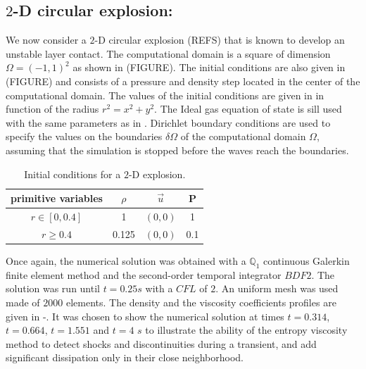\subsection{$2$-D circular explosion:} \label{sec:2d-circular-explosioin}
We now consider a $2$-D circular explosion (REFS) that is known to develop an unstable layer contact. The computational domain is a square of dimension $\Omega = (-1, 1)^2$ as shown in (FIGURE). The initial conditions are also given in (FIGURE) and consists of a pressure and density step located in the center of the computational domain. The values of the initial conditions are given in  in function of the radius $r^2 = x^2 + y^2$. The Ideal gas equation of state is sill used with the same parameters as in . Dirichlet boundary conditions are used to specify the values on the boundaries $\delta \Omega$ of the computational domain $\Omega$, assuming that the simulation is stopped before the waves reach the boundaries.
\begin{table}[H] 
\caption{\label{tb:ic-explosion} Initial conditions for a $2$-D explosion.}
\begin{center}
\begin{tabular}{|c|c|c|c|}
\hline
 primitive variables   & $\rho$ & $\vec{u}$ & P \\ \hline
 $r \in [ 0, 0.4 ]$& 1 & $(0,0)$ & 1\\ \hline
  $r \geq 0.4$& 0.125 & $(0,0)$ & 0.1\\ \hline
\end{tabular}
\end{center}
\nonumber
\end{table}
Once again, the numerical solution was obtained with a $\mathbb Q_1$ continuous Galerkin finite element method and the second-order temporal integrator $BDF2$. The solution was run until $t=0.25s$ with a $CFL$ of $2$. An uniform mesh was used made of $2000$ elements. The density and the viscosity coefficients profiles are given in -. It was chosen to show the numerical solution at times $t=0.314$, $t=0.664$, $t=1.551$ and $t=4$ $s$ to illustrate the ability of the entropy viscosity method to detect shocks and discontinuities during a transient, and add significant dissipation only in their close neighborhood. 
